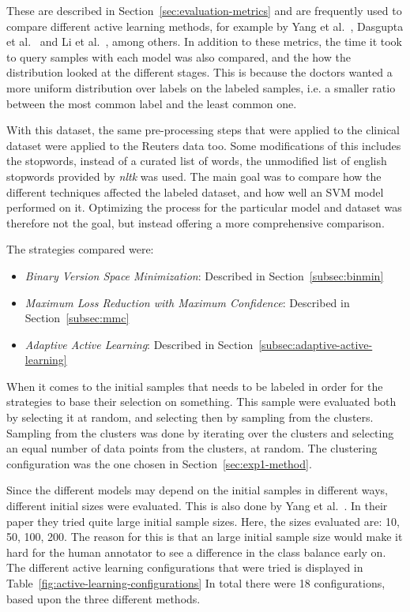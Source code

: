 These are described in Section~\ref{sec:evaluation-metrics} and are frequently used to compare different active learning methods, for example by Yang et al\@.~\cite{yang2009effective}, Dasgupta et al\@.~\cite{dasgupta2008hierarchical} and Li et al\@.~\cite{li2013active}, among others.
In addition to these metrics, the time it took to query samples with each model was also compared, and the how the distribution looked at the different stages.
This is because the doctors wanted a more uniform distribution over labels on the labeled samples, i.e. a smaller ratio between the most common label and the least common one.

With this dataset, the same pre-processing steps that were applied to the clinical dataset were applied to the Reuters data too.
Some modifications of this includes the stopwords, instead of a curated list of words, the unmodified list of english stopwords provided by \textit{nltk} was used.
The main goal was to compare how the different techniques affected the labeled dataset, and how well an SVM model performed on it.
Optimizing the process for the particular model and dataset was therefore not the goal, but instead offering a more comprehensive comparison.

The strategies compared were: 
\begin{itemize}
    \item \textit{Binary Version Space Minimization}: Described in Section~\ref{subsec:binmin}
    \item \textit{Maximum Loss Reduction with Maximum Confidence}: Described in Section~\ref{subsec:mmc}
    \item \textit{Adaptive Active Learning}: Described in Section~\ref{subsec:adaptive-active-learning}
\end{itemize}

When it comes to the initial samples that needs to be labeled in order for the strategies to base their selection on something.
This sample were evaluated both by selecting it at random, and selecting then by sampling from the clusters.
Sampling from the clusters was done by iterating over the clusters and selecting an equal number of data points from the clusters, at random.
The clustering configuration was the one chosen in Section~\ref{sec:exp1-method}.

Since the different models may depend on the initial samples in different ways, different initial sizes were evaluated.
This is also done by Yang et al\@.~\cite{yang2009effective}.
In their paper they tried quite large initial sample sizes.
Here, the sizes evaluated are: 10, 50, 100, 200.
The reason for this is that an large initial sample size would make it hard for the human annotator to see a difference in the class balance early on.
The different active learning configurations that were tried is displayed in Table~\ref{fig:active-learning-configurations}
In total there were 18 configurations, based upon the three different methods.

